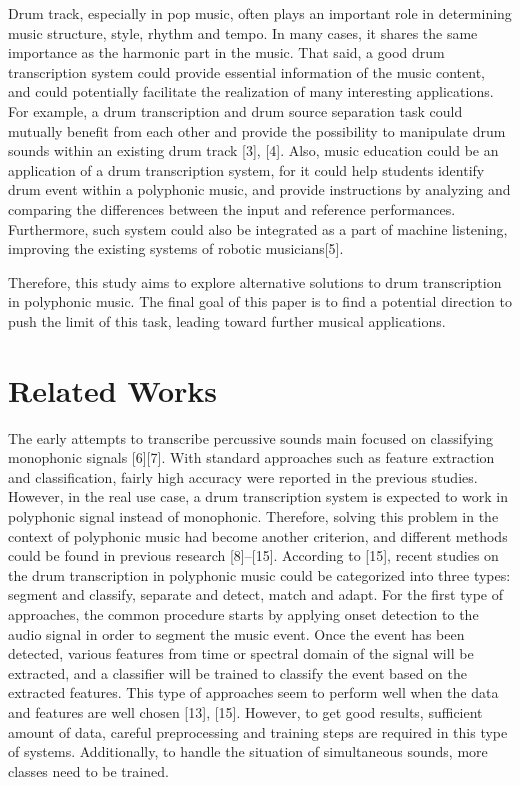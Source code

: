 \documentclass{article}
\begin{document}
Drum track, especially in pop music, often plays an important role in determining music structure, style, rhythm and tempo. In many cases, it shares the same importance as the harmonic part in the music. That said, a good drum transcription system could provide essential information of the music content, and could potentially facilitate the realization of many interesting applications. For example, a drum transcription and drum source separation task could mutually benefit from each other and provide the possibility to manipulate drum sounds within an existing drum track [3], [4].  Also, music education could be an application of a drum transcription system, for it could help students identify drum event within a polyphonic music, and provide instructions by analyzing and comparing the differences between the input and reference performances. Furthermore, such system could also be integrated as a part of machine listening, improving the existing systems of robotic musicians[5].

Therefore, this study aims to explore alternative solutions to drum transcription in polyphonic music. The final goal of this paper is to find a potential direction to push the limit of this task, leading toward further musical applications.

\section{Related Works}\label{sec:related works}
The early attempts to transcribe percussive sounds main focused on classifying monophonic signals [6][7]. With standard approaches such as feature extraction and classification, fairly high accuracy were reported in the previous studies. However, in the real use case, a drum transcription system is expected to work in polyphonic signal instead of monophonic. Therefore, solving this problem in the context of polyphonic music had become another criterion, and different methods could be found in previous research [8]–[15].  According to [15], recent studies on the drum transcription in polyphonic music could be categorized into three types: segment and classify, separate and detect, match and adapt.  For the first type of approaches, the common procedure starts by applying onset detection to the audio signal in order to segment the music event. Once the event has been detected, various features from time or spectral domain of the signal will be extracted, and a classifier will be trained to classify the event based on the extracted features. This type of approaches seem to perform well when the data and features are well chosen [13], [15]. However, to get good results, sufficient amount of data, careful preprocessing and training steps are required in this type of systems. Additionally, to handle the situation of simultaneous sounds, more classes need to be trained.
\end{document}
